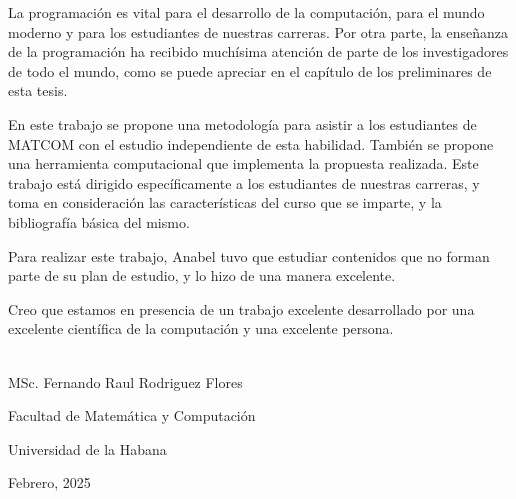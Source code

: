 \begin{opinion}
    La programación es vital para el desarrollo de la computación, para el mundo moderno y para los estudiantes de nuestras carreras.  Por otra parte, la enseñanza de la programación ha recibido muchísima atención de parte de los investigadores de todo el mundo, como se puede apreciar en el capítulo de los preliminares de esta tesis.  

    En este trabajo se propone una metodología para asistir a los estudiantes de MATCOM con el estudio independiente de esta habilidad.  También se propone una herramienta computacional que implementa la propuesta realizada.   Este trabajo está dirigido específicamente a los estudiantes de nuestras carreras, y toma en consideración las características del curso que se imparte, y la bibliografía básica del mismo.

    Para realizar este trabajo, Anabel tuvo que estudiar contenidos que no forman parte de su plan de estudio, y lo hizo de una manera excelente.  

    Creo que estamos en presencia de un trabajo excelente desarrollado por una excelente científica de la computación y una excelente persona.

    \vspace{1cm}


    \begin{flushright}
    \underline{\hspace{6.5cm}}\\
    MSc. Fernando Raul Rodriguez Flores

    Facultad de Matemática y Computación
    
    Universidad de la Habana

    Febrero, 2025
    \end{flushright}
\end{opinion}
